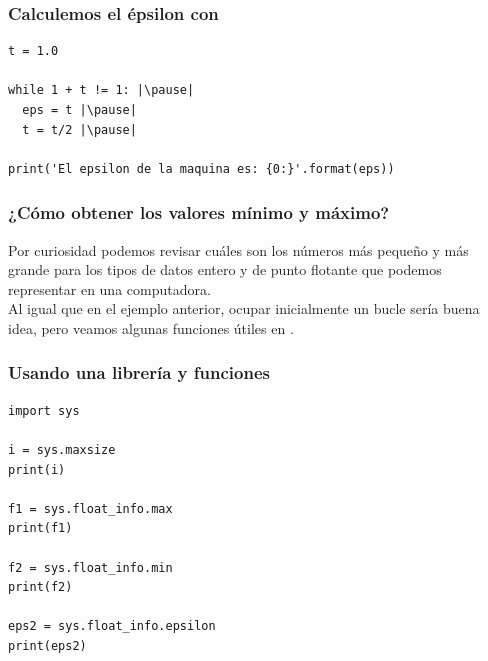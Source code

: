 \documentclass[12pt]{beamer}
\begin{document}
\begin{frame}[fragile]
\frametitle{Calculemos el épsilon con \python}
\begin{lstlisting}[caption=Código para el épsilon]
t = 1.0

while 1 + t != 1: |\pause|
  eps = t |\pause|
  t = t/2 |\pause|

print('El epsilon de la maquina es: {0:}'.format(eps))
\end{lstlisting}
\end{frame}
\begin{frame}
\frametitle{¿Cómo obtener los valores mínimo y máximo?}
Por curiosidad podemos revisar cuáles son los números más pequeño y más grande para los tipos de datos entero y de punto flotante que podemos representar en una computadora.
\\
\bigskip
\pause
Al igual que en el ejemplo anterior, ocupar inicialmente un bucle sería buena idea, pero veamos algunas funciones útiles en \python.
\end{frame}
\begin{frame}
\frametitle{Usando una librería y funciones}
\begin{lstlisting}[caption=Obteniendo valores mínimo y máximo]
import sys

i = sys.maxsize
print(i)

f1 = sys.float_info.max
print(f1)

f2 = sys.float_info.min
print(f2)

eps2 = sys.float_info.epsilon
print(eps2)
\end{lstlisting}
\end{frame}
\end{document}
